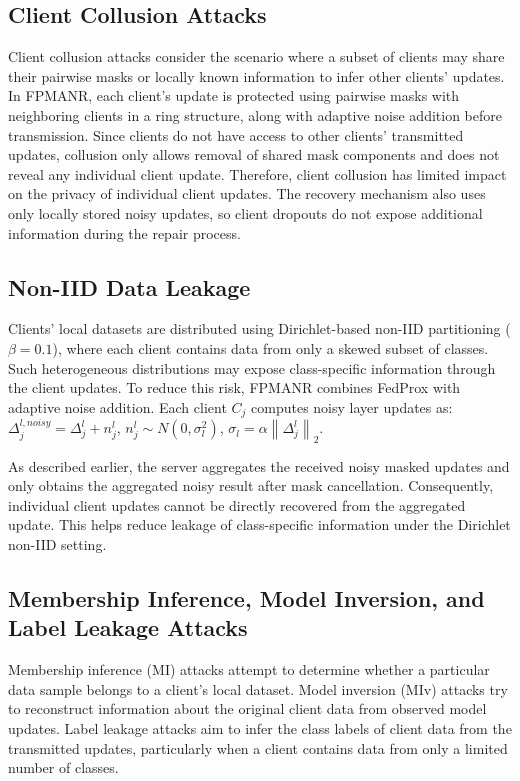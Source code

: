 \documentclass[a4paper,fleqn]{cas-dc}
\begin{document}
\subsection{Client Collusion Attacks}

Client collusion attacks consider the scenario where a subset of clients may share their pairwise masks or locally known information to infer other clients' updates. In FPMANR, each client's update is protected using pairwise masks with neighboring clients in a ring structure, along with adaptive noise addition before transmission. Since clients do not have access to other clients' transmitted updates, collusion only allows removal of shared mask components and does not reveal any individual client update. Therefore, client collusion has limited impact on the privacy of individual client updates. The recovery mechanism also uses only locally stored noisy updates, so client dropouts do not expose additional information during the repair process.

\subsection{Non-IID Data Leakage}

Clients' local datasets are distributed using Dirichlet-based non-IID partitioning ($\beta = 0.1$), where each client contains data from only a skewed subset of classes. Such heterogeneous distributions may expose class-specific information through the client updates. To reduce this risk, FPMANR combines FedProx with adaptive noise addition. Each client $C_{j}$ computes noisy layer updates as: $\Delta_{j}^{l, noisy} = \Delta_{j}^{l} + n_{j}^{l}$, $n_{j}^{l} \sim N\left( 0, \sigma_{l}^{2} \right)$, $\sigma_{l} = \alpha\left\| \Delta_{j}^{l} \right\|_{2}$.

As described earlier, the server aggregates the received noisy masked updates and only obtains the aggregated noisy result after mask cancellation. Consequently, individual client updates cannot be directly recovered from the aggregated update. This helps reduce leakage of class-specific information under the Dirichlet non-IID setting.

\subsection{Membership Inference, Model Inversion, and Label Leakage Attacks}

Membership inference (MI) attacks attempt to determine whether a particular data sample belongs to a client's local dataset. Model inversion (MIv) attacks try to reconstruct information about the original client data from observed model updates. Label leakage attacks aim to infer the class labels of client data from the transmitted updates, particularly when a client contains data from only a limited number of classes.
\end{document}
